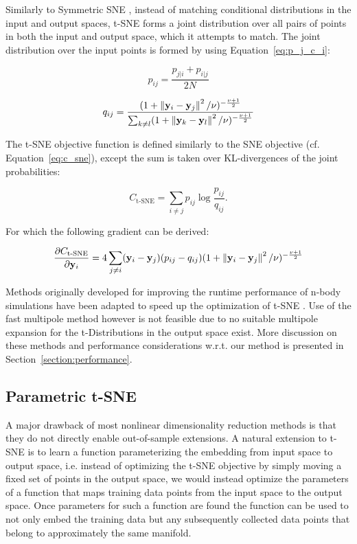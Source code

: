 Similarly to Symmetric SNE \cite{symmetric_sne}, instead of matching conditional distributions in the input and output spaces, t-SNE forms a joint distribution over all pairs of points in both the input and output space, which it attempts to match. The joint distribution over the input points is formed by using Equation~\ref{eq:p_j_c_i}:

$$p_{ij} = \frac{p_{j \vert i} + p_{i \vert j}}{2 N}$$

$$q_{ij} = \frac{(1 + \left\lVert\mathbf{y}_i - \mathbf{y}_j\right\rVert^2 / \nu)^{-\frac{\nu + 1}{2}}}{\sum_{k \neq l} (1 + \left\lVert\mathbf{y}_k - \mathbf{y}_l\right\rVert^2 / \nu)^{-\frac{\nu + 1}{2}}}$$

The t-SNE objective function is defined similarly to the SNE objective (cf. Equation~\ref{eq:c_sne}), except the sum is taken over KL-divergences of the joint probabilities:

$$C_{\text{t-SNE}} = \sum_{i \neq j} p_{ij} \log \frac{p_{ij}}{q_{ij}}.$$

For which the following gradient can be derived:

\begin{equation}
\frac{\partial C_{\text{t-SNE}}}{\partial \mathbf{y}_i} = 4 \sum_{j \neq i} (\mathbf{y}_i - \mathbf{y}_j)(p_{ij} - q_{ij})(1 + \left\lVert\mathbf{y}_i - \mathbf{y}_j\right\rVert^2 / \nu)^{-\frac{\nu + 1}{2}}
\label{eq:c_tsne_grad}
\end{equation}

Methods originally developed for improving the runtime performance of n-body simulations have been adapted to speed up the optimization of t-SNE \cite{accelerated_tsne_1, accelerated_tsne_2}. Use of the fast multipole method \cite{fast_multipole} however is not feasible due to no suitable multipole expansion for the t-Distributions in the output space exist. More discussion on these methods and performance considerations w.r.t. our method is presented in Section~\ref{section:performance}.


\subsection{Parametric t-SNE}
\label{subsection:parametric_tsne}

A major drawback of most nonlinear dimensionality reduction methods is that they do not directly enable out-of-sample extensions. A natural extension to t-SNE is to learn a function parameterizing the embedding from input space to output space, i.e. instead of optimizing the t-SNE objective by simply moving a fixed set of points in the output space, we would instead optimize the parameters of a function that maps training data points from the input space to the output space. Once parameters for such a function are found the function can be used to not only embed the training data but any subsequently collected data points that belong to approximately the same manifold.

